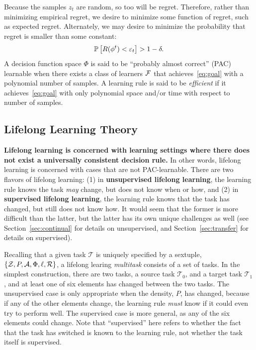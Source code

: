 \documentclass{article}
\begin{document}
Because the samples $z_t$ are random, so too will be regret.  Therefore, rather than minimizing empirical regret, we desire to minimize some function of regret, such as expected regret. 
% 
Alternately, we may desire to minimize the probability that regret is smaller than some constant:
\begin{align} \label{eq:goal}
    \mathbb{P} \left[R(\phi^t)  < \varepsilon_t \right] > 1 - \delta.
\end{align}
A decision function space $\Phi$ is said to be ``probably almost correct'' (PAC) learnable when there exists a class of learners $\mathcal{F}$ that achieves~\eqref{eq:goal} with a polynomial number of samples.  A learning rule is said to be \emph{efficient} if it achieves~\eqref{eq:goal} with only polynomial space and/or time with respect to number of samples.  

\subsection{Lifelong Learning Theory}

\textbf{Lifelong learning is concerned with learning settings where there does not exist a universally consistent decision rule.}  In other words, lifelong learning is concerned with cases that are not PAC-learnable.  There are two flavors of lifelong learning: (1) in \textbf{unsupervised lifelong learning}, the learning rule knows the task \emph{may} change, but does not know when or how, and (2) in \textbf{supervised lifelong learning}, the learning rule knows that the task has changed, but still does not know how.  It would seem that the former is more difficult than the latter, but the latter has its own unique challenges as well (see Section~\ref{sec:continual} for details on unsupervised, and Section~\ref{sec:transfer} for details on supervised).  

Recalling that a given task $\mathcal{T}$ is uniquely specified by a sextuple, $\{\mathcal{Z}, P, \mathcal{A}, \Phi, \ell, \mathcal{R}\}$, a lifelong learing \emph{multitask} consists of a set of tasks.  In the simplest construction, there are two tasks, a source task $\mathcal{T}_0$, and a target task $\mathcal{T}_1$, and at least one of six elements has changed between the two tasks.  The unsupervised case is only appropriate when the density, $P$, has changed, because if any of the other elements change, the learning rule \emph{must} know if it could even try to perform well.  The supervised case is more general, as any of the six elements could change. Note that ``supervised'' here refers to whether the fact that the task has switched is known to the learning rule, not whether the task itself is supervised.  
\end{document}
